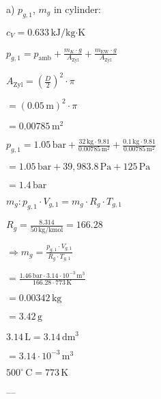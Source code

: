 a) \( p_{g,1} \), \( m_g \) in cylinder:  

\( c_V = 0.633 \, \text{kJ/kg·K} \)  

\( p_{g,1} = p_{\text{amb}} + \frac{m_K \cdot g}{A_{\text{Zyl}}} + \frac{m_{\text{EW}} \cdot g}{A_{\text{Zyl}}} \)  

\( A_{\text{Zyl}} = \left( \frac{D}{2} \right)^2 \cdot \pi \)  

\( = (0.05 \, \text{m})^2 \cdot \pi \)  

\( = 0.00785 \, \text{m}^2 \)  

\( p_{g,1} = 1.05 \, \text{bar} + \frac{32 \, \text{kg} \cdot 9.81}{0.00785 \, \text{m}^2} + \frac{0.1 \, \text{kg} \cdot 9.81}{0.00785 \, \text{m}^2} \)  

\( = 1.05 \, \text{bar} + 39,983.8 \, \text{Pa} + 125 \, \text{Pa} \)  

\( = 1.4 \, \text{bar} \)  

\( m_g: p_{g,1} \cdot V_{g,1} = m_g \cdot R_g \cdot T_{g,1} \)  

\( R_g = \frac{8.314}{50 \, \text{kg/kmol}} = 166.28 \)  

\( \Rightarrow m_g = \frac{p_{g,1} \cdot V_{g,1}}{R_g \cdot T_{g,1}} \)  

\( = \frac{1.46 \, \text{bar} \cdot 3.14 \cdot 10^{-3} \, \text{m}^3}{166.28 \cdot 773 \, \text{K}} \)  

\( = 0.00342 \, \text{kg} \)  

\( = 3.42 \, \text{g} \)  

\( 3.14 \, \text{L} = 3.14 \, \text{dm}^3 \)  

\( = 3.14 \cdot 10^{-3} \, \text{m}^3 \)  

\( 500^\circ \, \text{C} = 773 \, \text{K} \)  

---